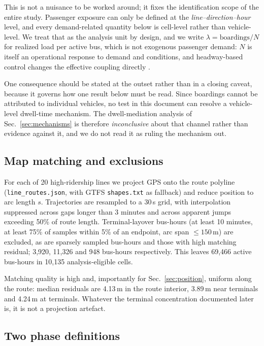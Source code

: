 \documentclass[9pt,twocolumn,twoside]{opticajnl}
\begin{document}
This is not a nuisance to be worked around; it fixes the identification scope of the entire
study. Passenger exposure can only be defined at the
\textit{line--direction--hour} level, and every demand-related quantity below is cell-level
rather than vehicle-level. We treat that as the analysis unit by design, and we write
$\lambda = \text{boardings}/N$ for realized load per active bus, which is not exogenous
passenger demand: $N$ is itself an operational response to demand and conditions, and
headway-based control changes the effective coupling directly \cite{daganzo09}.

One consequence should be stated at the outset rather than in a closing caveat, because it
governs how one result below must be read. Since boardings cannot be attributed to individual
vehicles, no test in this document can resolve a vehicle-level dwell-time mechanism. The
dwell-mediation analysis of Sec.~\ref{sec:mechanisms} is therefore \emph{inconclusive} about
that channel rather than evidence against it, and we do not read it as ruling the mechanism out.

\subsection{Map matching and exclusions}

For each of 20 high-ridership lines we project GPS onto the route polyline
(\texttt{line\_routes.json}, with GTFS \texttt{shapes.txt} as fallback) and reduce position to
arc length $s$. Trajectories are resampled to a 30\,s grid, with interpolation suppressed across
gaps longer than 3 minutes and across apparent jumps exceeding 50\% of route length.
Terminal-layover bus-hours (at least 10 minutes, at least 75\% of samples within 5\% of an
endpoint, arc span $\le 150$\,m) are excluded, as are sparsely sampled bus-hours and those with
high matching residual; 3{,}920, 11{,}326 and 948 bus-hours respectively. This leaves
69{,}466 active bus-hours in 10{,}135 analysis-eligible cells.

Matching quality is high and, importantly for Sec.~\ref{sec:position}, uniform along the route:
median residuals are 4.13\,m in the route interior, 3.89\,m near terminals and 4.24\,m at
terminals. Whatever the terminal concentration documented later is, it is not a projection
artefact.

\subsection{Two phase definitions}\label{sec:phase}
\end{document}
